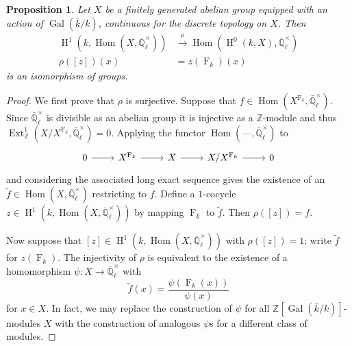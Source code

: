 \documentclass[11pt]{amsart}
\theoremstyle{plain}
\newtheorem{proposition}[theorem]{Proposition}
\theoremstyle{definition}
\theoremstyle{remark}
\newcommand{\ZZ}{{\mathbb{Z}}}
\newcommand{\EE}{\mathbb{\bar Q}_\ell}
\newcommand{\bFq}{\bar{k}}
\newcommand{\Fq}{k}
\newcommand{\EEx}{\EE^\times}
\DeclareMathOperator{\Gal}{Gal}
\newcommand{\Frob}[1]{{\operatorname{F}_{#1}}}
\DeclareMathOperator{\Hom}{Hom}
\DeclareMathOperator{\Ext}{Ext}
\DeclareMathOperator{\Hh}{H}
\begin{document}
\begin{proposition}\label{prop:X}
  Let $X$ be a finitely generated abelian group equipped with an
  action of $\Gal(\bFq/\Fq)$, continuous for the discrete topology on
  $X$.  Then
  \begin{align*}
    \Hh^1(\Fq, \Hom(X, \EEx)) &\xrightarrow{\rho} \Hom(\Hh^0(\Fq, X), \EEx) \\
    \rho([z])(x) &= z(\Frob{\Fq})(x)
  \end{align*}
  is an isomorphism of groups.
\end{proposition}
\begin{proof}
  We first prove that $\rho$ is surjective.  Suppose that
  $f \in \Hom(X^\Frob{\Fq}, \EEx).$ Since $\EEx$ is divisible
  as an abelian group it is injective as a $\ZZ$-module and thus
  $\Ext^1_{\ZZ}(X/X^\Frob{\Fq}, \EEx) = 0$.  Applying the functor
  $\Hom(\mbox{---}, \EEx)$ to
  \[
  \begin{tikzcd}
  0 \rar & X^\Frob{\Fq} \rar & X \rar & X/X^\Frob{\Fq} \rar & 0
  \end{tikzcd}
  \]
  and considering the associated long exact sequence gives the
  existence of an $\tilde{f} \in \Hom(X, \EEx)$ restricting to
  $f$.  Define a $1$-cocycle $z \in \Hh^1(\Fq, \Hom(X,\EEx))$ by
  mapping $\Frob{\Fq}$ to $\tilde{f}$.  Then $\rho([z]) = f$.

  Now suppose that $[z] \in \Hh^1(\Fq,\Hom(X,\EEx))$ with
  $\rho([z]) = 1$; write $\tilde{f}$ for $z(\Frob{\Fq})$.  The injectivity
  of $\rho$ is equivalent to the existence of a homomorphism $\psi
  \colon X \rightarrow \EEx$ with
  $$\tilde{f}(x) = \frac{\psi(\Frob{\Fq}(x))}{\psi(x)}$$
  for $x \in X$.  In fact, we may replace the construction of $\psi$
  for all $\ZZ[\Gal(\bFq/\Fq)]$-modules $X$ with the construction of
  analogous $\psi$s for a different class of modules.


\end{proof}
\end{document}
